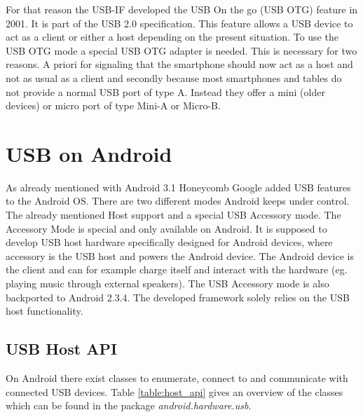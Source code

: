 For that reason the USB-IF developed the USB On the go (USB OTG) feature in 2001. It is part of the USB 2.0 specification\cite{wiki_usb}. This feature allows a USB device to act as a client or either a host depending on the present situation. To use the USB OTG mode a special USB OTG adapter is needed. This is necessary for two reasons. A priori for signaling that the smartphone should now act as a host and not as usual as a client and secondly because most smartphones and tables do not provide a normal USB port of type A. Instead they offer a mini (older devices) or micro port of type Mini-A or Micro-B\cite{wiki_usb_otg}. 

\chapter{USB on Android}

As already mentioned with Android 3.1 Honeycomb Google added USB features to the Android OS. There are two different modes Android keeps under control. The already mentioned Host support and a special USB Accessory mode. The Accessory Mode is special and only available on Android. It is supposed to develop USB host hardware specifically designed for Android devices, where accessory is the USB host and powers the Android device\cite{android_usb_accessory}. The Android device is the client and can for example charge itself and interact with the hardware (eg. playing music through external speakers). The USB Accessory mode is also backported to Android 2.3.4\cite{android_usb_accessory}. The developed framework solely relies on the USB host functionality.

\section{USB Host API}

On Android there exist classes to enumerate, connect to and communicate with connected USB devices. Table \ref{table:host_api} gives an overview of the classes which can be found in the package \textit{android.hardware.usb}.

